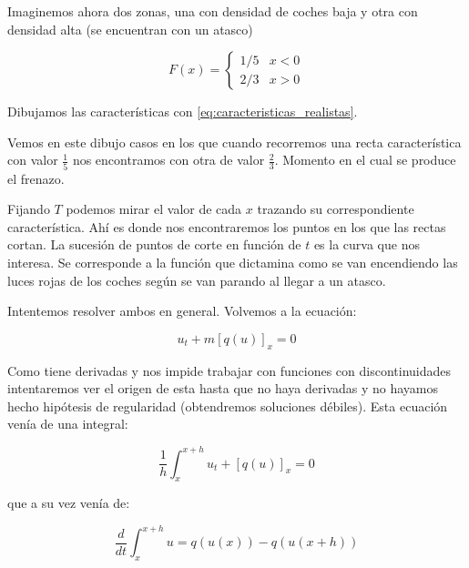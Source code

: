		\begin{example}[Frenazo]

			Imaginemos ahora dos zonas, una con densidad de coches baja y otra con densidad alta (se encuentran con un atasco)

			\begin{figure}[!htb]
				\centering
				\caption{}
				\label{fig:modeloAtasco}
			\end{figure}

			$$F(x) =
			\begin{cases}
				1/5 & x < 0 \\
				2/3 & x > 0
			\end{cases}
			$$

			Dibujamos las características con \ref{eq:caracteristicas_realistas}.

			\begin{figure}[!htb]
				\centering
				\caption{}
				\label{fig:ondaChoque}
			\end{figure}

			Vemos en este dibujo casos en los que cuando recorremos una recta característica con valor $\frac{1}{5}$ nos encontramos con otra de valor $\frac{2}{3}$. Momento en el cual se produce el frenazo.

			Fijando $T$ podemos mirar el valor de cada $x$ trazando su correspondiente característica. Ahí es donde nos encontraremos los puntos en los que las rectas cortan. La sucesión de puntos de corte en función de $t$ es la curva que nos interesa. Se corresponde a la función que dictamina como se van encendiendo las luces rojas de los coches según se van parando al llegar a un atasco.

		\end{example}

		Intentemos resolver ambos en general. Volvemos a la ecuación:

		$$u_t +m [q(u)]_x = 0$$

		Como tiene derivadas y nos impide trabajar con funciones con discontinuidades intentaremos ver el origen de esta hasta que no haya derivadas y no hayamos hecho hipótesis de regularidad (obtendremos soluciones débiles). Esta ecuación venía de una integral:

		$$\frac{1}{h} \int^{x+h}_{x} u_t + [q(u)]_x = 0$$

		que a su vez venía de:

		$$\frac{d}{dt} \int^{x+h}_{x} u = q(u(x))-q(u(x+h))$$

